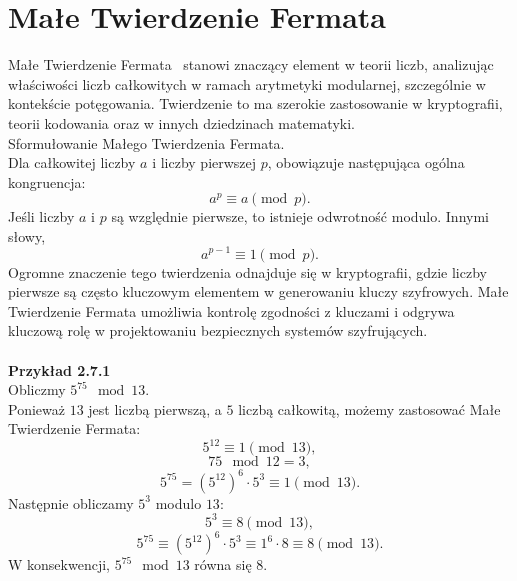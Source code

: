 \documentclass{SGGW-thesis}
\begin{document}
	\section{Małe Twierdzenie Fermata}
	Małe Twierdzenie Fermata~\cite{ajakubiec}\cite{r27modulo} stanowi znaczący element w teorii liczb, analizując właściwości liczb całkowitych w ramach arytmetyki modularnej, szczególnie w kontekście potęgowania. Twierdzenie to ma szerokie zastosowanie w kryptografii, teorii kodowania oraz w innych dziedzinach matematyki.
	\vspace{1em}
	\\
	\noindent Sformułowanie Małego Twierdzenia Fermata.
	\vspace{1em}
	\\
	Dla całkowitej liczby \( a \) i liczby pierwszej \( p \), obowiązuje następująca ogólna kongruencja:
	\begin{equation}
		a^p \equiv a \pmod{p}.
	\end{equation}
	Jeśli liczby \( a \) i \( p \) są względnie pierwsze, to istnieje odwrotność modulo. Innymi słowy,
	\begin{equation}
		a^{p-1} \equiv 1 \pmod{p}.
	\end{equation}
	Ogromne znaczenie tego twierdzenia odnajduje się w kryptografii, gdzie liczby pierwsze są często kluczowym elementem w generowaniu kluczy szyfrowych. Małe Twierdzenie Fermata umożliwia kontrolę zgodności z kluczami i odgrywa kluczową rolę w projektowaniu bezpiecznych systemów szyfrujących.
	\\
	\\
	\noindent \textbf{Przykład 2.7.1}
	\\
	Obliczmy \( 5^{75} \mod 13 \).
	\\
	Ponieważ \( 13 \) jest liczbą pierwszą, a \( 5 \) liczbą całkowitą, możemy zastosować Małe Twierdzenie Fermata:
	\[ 5^{12} \equiv 1 \pmod{13}, \]
	\[ 75 \mod 12 = 3, \]
	\[ 5^{75} = (5^{12})^6 \cdot 5^3 \equiv 1 \pmod{13}. \]
	Następnie obliczamy \( 5^{3} \) modulo \( 13 \):
	\[ 5^3 \equiv 8 \pmod{13}, \] 
	\[ 5^{75} \equiv (5^{12})^6 \cdot 5^3 \equiv 1^6 \cdot 8 \equiv 8 \pmod{13}. \]
	W konsekwencji, \( 5^{75} \mod 13 \) równa się \( 8 \).
	\newpage
	
\end{document}
